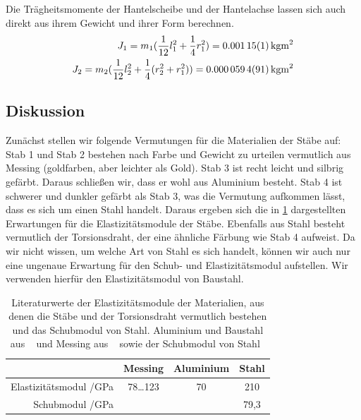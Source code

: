 \documentclass[
	a4paper,
	12pt,
	pagesize,
	ngerman
]{scrartcl}
\begin{document}
	Die Trägheitsmomente der Hantelscheibe und der Hantelachse lassen sich auch direkt aus ihrem Gewicht und ihrer Form berechnen.
	\begin{align}
		J_1 = m_1(\frac{1}{12}l_1^2+\frac{1}{4}r_1^2) = \SI{0,00115 \pm0,00001}{kgm^2}\\
		J_2 = m_2(\frac{1}{12}l_2^2+\frac{1}{4}(r_2^2 + r_1^2))= \SI{0,0000594\pm 0,0000091}{kgm^2}
	\end{align}
	
	\subsection{Diskussion}
	Zunächst stellen wir folgende Vermutungen für die Materialien der Stäbe auf: Stab 1 und Stab 2 bestehen nach Farbe und Gewicht zu urteilen vermutlich aus Messing (goldfarben, aber leichter als Gold). Stab 3 ist recht leicht und silbrig gefärbt. Daraus schließen wir, dass er wohl aus Aluminium besteht. Stab 4 ist schwerer und dunkler gefärbt als Stab 3, was die Vermutung aufkommen lässt, dass es sich um einen Stahl handelt. Daraus ergeben sich die in \cref{Tabelle_Elastizitätsmodule_Literatur} dargestellten Erwartungen für die Elastizitätsmodule der Stäbe. Ebenfalls aus Stahl besteht vermutlich der Torsionsdraht, der eine ähnliche Färbung wie Stab 4 aufweist. Da wir nicht wissen, um welche Art von Stahl es sich handelt, können wir auch nur eine ungenaue Erwartung für den Schub- und Elastizitätsmodul aufstellen. Wir verwenden hierfür den Elastizitätsmodul von Baustahl.
	
	\begin{table}[tb]
		\centering
		\begin{tabular}{ r | c | c | c |}
			&  Messing & Aluminium& Stahl\\ \hline
			Elastizitätsmodul /\si{\giga \pascal} & 78…123 & 70 & 210\\
			Schubmodul /\si{\giga \pascal} & & & 79,3 \\
			\hline
		\end{tabular}
		\caption{Literaturwerte der Elastizitätsmodule der Materialien, aus denen die Stäbe und der Torsionsdraht vermutlich bestehen und das Schubmodul von Stahl. Aluminium und Baustahl aus ~\cite[S. 624 f.]{Taschenbuch} und Messing aus ~\cite[S. E 66.]{Huette} sowie der Schubmodul von Stahl~\cite{Solids}} %
		\label{Tabelle_Elastizitätsmodule_Literatur} 
	\end{table}
	
\end{document}
